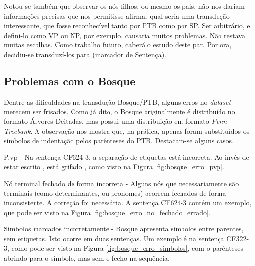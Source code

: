 Notou-se também que observar os nós filhos, ou mesmo os pais, não nos dariam informações precisas que nos permitisse afirmar qual seria uma transdução interessante, que fosse reconhecível tanto por PTB como por SP. Ser arbitrário, e defini-lo como VP ou NP, por exemplo, causaria muitos problemas. Não restava muitas escolhas. Como trabalho futuro, caberá o estudo deste par. Por ora, decidiu-se transduzí-los para  (marcador de Sentença).
\subsection{Problemas com o Bosque}
\label{subsec:erros_bosque}
Dentre as dificuldades na transdução Bosque/PTB, alguns erros no \textit{dataset} merecem ser frisados. Como já dito, o Bosque originalmente é distribuído no formato Árvores Deitadas, mas possui uma distribuição em formato \textit{Penn Treebank}. A observação nos mostra que, na prática, apenas foram substituídos os símbolos de indentação pelos parênteses do PTB. 
Destacam-se alguns casos.

P.vp - Na sentença CF624-3, a separação de etiquetas está incorreta. Ao invés de estar escrito , está grifado , como visto na Figura \ref{fig:bosque_erro_pvp}.

\begin{center}
    
\end{center}

Nó terminal fechado de forma incorreta - Alguns nós que necessariamente são terminais (como determinantes, ou pronomes) ocorrem fechados de forma inconsistente. A correção foi necessária. A sentença CF624-3 contém um exemplo, que pode ser visto na Figura \ref{fig:bosque_erro_no_fechado_errado}.

\begin{center}
    
\end{center}

Símbolos marcados incorretamente - Bosque apresenta símbolos entre parentes, sem etiquetas. Isto ocorre em duas sentenças. Um exemplo é na sentença CF322-3, como pode ser visto na Figura \ref{fig:bosque_erro_simbolos}, com o parênteses abrindo para o símbolo, mas sem o fecho na sequência. 

\begin{center}
    
\end{center}

